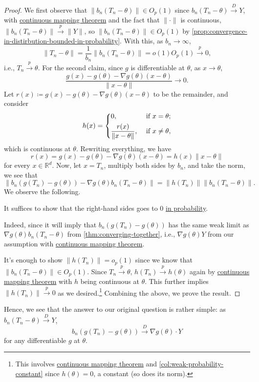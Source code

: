\begin{proof}
	We first observe that \(\lVert b_n (T_n - \theta ) \rVert \in O_p(1)\) since \(b_n(T_n - \theta ) \overset{D}{\to } Y\), with \hyperref[thm:continuous-mapping]{continuous mapping theorem} and the fact that \(\lVert \cdot \rVert \) is continuous, \(\lVert b_n (T_n - \theta ) \rVert \overset{p}{\to } \lVert Y \rVert \), so \(\lVert b_n (T_n - \theta ) \rVert \in O_p(1)\) by \autoref{prop:convergence-in-distirbution-bounded-in-probability}. With this, as \(b_n \to \infty \),
	\[
		\lVert T_n - \theta \rVert
		= \frac{1}{b_n} \lVert b_n (T_n - \theta ) \rVert
		= o(1) O_p(1)
		\overset{p}{\to } 0,
	\]
	i.e., \(T_n \overset{p}{\to } \theta \). For the second claim, since \(g\) is differentiable at \(\theta \), as \(x \to \theta \),
	\[
		\frac{g(x) - g(\theta ) - \nabla g(\theta ) (x - \theta )}{\lVert x - \theta \rVert } \to 0.
	\]
	Let \(r(x) \coloneqq g(x) - g(\theta ) - \nabla g(\theta ) (x - \theta )\) to be the remainder, and consider
	\[
		h(x) = \begin{dcases}
			0,                                       & \text{ if } x = \theta  ;   \\
			\frac{r(x)}{\lVert x - \theta  \rVert }, & \text{ if } x \neq \theta ,
		\end{dcases}
	\]
	which is continuous at \(\theta \). Rewriting everything, we have
	\[
		r(x)
		= g(x) - g(\theta ) - \nabla g(\theta ) (x - \theta )
		= h(x) \lVert x - \theta \rVert
	\]
	for every \(x \in \mathbb{R} ^d\). Now, let \(x = T_n\), multiply both sides by \(b_n\), and take the norm, we see that
	\[
		\left\lVert b_n \left( g(T_n) - g(\theta ) \right)  - \nabla g(\theta ) b_n (T_n - \theta ) \right\rVert
		= \lVert h(T_n) \rVert \lVert  b_n (T_n - \theta ) \rVert.
	\]
	We observe the following.

	\begin{claim}
		It suffices to show that the right-hand sides goes to \(0\) \hyperref[def:converge-in-probability]{in probability}.
	\end{claim}
	\begin{explanation}
		Indeed, since it will imply that \(b_n(g(T_n) - g(\theta ))\) has the same weak limit as \(\nabla g(\theta ) b_n (T_n - \theta )\) from \autoref{thm:converging-together}, i.e., \(\nabla g(\theta ) Y\) from our assumption with \hyperref[thm:continuous-mapping]{continuous mapping theorem}.
	\end{explanation}

	It's enough to show \(\lVert h(T_n) \rVert = o_p(1)\) since we know that \(\lVert b_n (T_n - \theta ) \rVert \in O_p(1)\). Since \(T_n \overset{p}{\to } \theta \), \(h(T_n) \overset{p}{\to } h(\theta )\) again by \hyperref[thm:continuous-mapping]{continuous mapping theorem} with \(h\) being continuous at \(\theta \). This further implies \(\lVert h(T_n) \rVert \overset{p}{\to } 0\) as we desired.\footnote{This involves \hyperref[thm:continuous-mapping]{continuous mapping theorem} and \autoref{col:weak-probability-constant} since \(h(\theta ) = 0\), a constant (so does its norm).} Combining the above, we prove the result.
\end{proof}

Hence, we see that the answer to our original question is rather simple: as \(b_n(T_n - \theta ) \overset{D}{\to } Y\),
\[
	b_n(g(T_n) - g(\theta )) \overset{D}{\to } \nabla g(\theta ) \cdot Y
\]
for any differentiable \(g\) at \(\theta \).